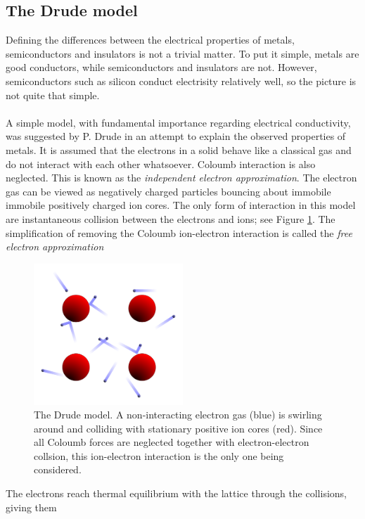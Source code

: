 \subsection{\textbf{The Drude model} \cite{Hofmann} }
Defining the differences between the electrical properties of metals, semiconductors and insulators
is not a trivial matter. To put it simple, metals are good conductors, while semiconductors and 
insulators are not. However, semiconductors such as silicon conduct electrisity relatively well,
so the picture is not quite that simple.
\\
\\
A simple model, with fundamental importance regarding electrical conductivity, was suggested by
P. Drude in an attempt to explain the observed properties of metals. It is assumed that the 
electrons in a solid behave like a classical gas and do not interact with each other whatsoever.
Coloumb interaction is also neglected. This is known as the \textit{independent electron approximation}. 
The electron gas can be viewed as negatively charged particles bouncing about
immobile immobile positively charged ion cores. The only form of interaction in this model
are instantaneous collision between the electrons and ions; see Figure \ref{fig:DrudeModel}. 
The simplification of removing the Coloumb ion-electron interaction is called the 
\textit{free electron approximation}
%
\begin{figure}[h!]
  \centering
   \includegraphics[width=0.5\textwidth]{../Figures/DrudeModel.pdf}
   \caption{ 
      The Drude model. A non-interacting electron gas (blue) is swirling around and colliding with 
      stationary positive ion cores (red). 
      Since all Coloumb forces are neglected together with electron-electron
      collsion, this ion-electron interaction is the only one being considered.
   }
   \label{fig:DrudeModel}
\end{figure}
%
The electrons reach thermal equilibrium with the lattice through the collisions, giving them
